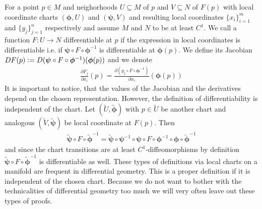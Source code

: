 \documentclass[../main.tex]{subfiles}
\begin{document}
For a point $p \in M$ and neighorhoods $U \subseteq M$ of $p$ and 
$V \subseteq N$ of $F(p)$ with local coordinate charts 
$(\boldsymbol{\phi}, U)$ and $(\boldsymbol{\psi}, V)$  and resulting local coordinates 
$\{x_i\}_{i=1}^m$ and $\{ y_j\}_{j=1}^n$ respectively and assume 
$M$ and $N$ to be at least $C^1$. We call a function 
$F: U \rightarrow N$ differentiable at $p$ if the expression in local coordinates
is differentiable i.e. if 
$\boldsymbol{\psi} \circ F \circ \boldsymbol{\phi}^{-1}$ is differentiable
at $\boldsymbol{\phi}(p)$.
We define its Jacobian $DF(p) \vcentcolon= D(\boldsymbol{\psi} \circ F \circ 
\boldsymbol{\phi}^{-1})(\boldsymbol{\phi}(p))$ 
and we denote 
\begin{align}
    \frac{\partial F_j}{\partial x_i}(p) 
    = \frac{\partial (y_j \circ F \circ \boldsymbol{\phi}^{-1})}{\partial x_i} (\boldsymbol{\phi}(p))
    \label{eq:derivative_on_manifold} 
\end{align}
It is important to notice, that the values of the Jacobian 
and the derivatives depend on the chosen representation.
However, the definition of differentiability is independent of the chart. 
Let $(\tilde{U},\boldsymbol{\tilde{\phi}})$ with $p \in \tilde{U}$ be 
another chart and analogous $(\tilde{V},\boldsymbol{\tilde{\psi}})$ be local coordinate 
at $F(p)$.
Then 
\begin{align*}
    \boldsymbol{\tilde{\psi}} \circ F \circ \boldsymbol{\tilde{\phi}}^{-1} 
    = \boldsymbol{\tilde{\psi}} \circ \bm{\psi}^{-1} \circ \bm{\psi} \circ F \circ \bm{\phi}^{-1} 
        \circ \bm{\phi} \circ \boldsymbol{\tilde{\phi}}^{-1}
\end{align*}
and since the chart transitions are at least $C^1$-diffeomorphisms by definition
$\boldsymbol{\tilde{\psi}} \circ F \circ \boldsymbol{\tilde{\phi}}^{-1} $ is differentiable as well.
These types of definitions via local charts on a manifold are frequent in
differential geometry. This is a proper definition if it is independent of the 
chosen chart. Because we do not want to bother with the technicalities of 
differential geometry too much we will very often leave out these types of
proofs. 
\end{document}

